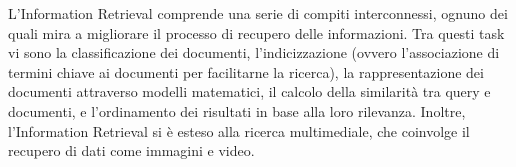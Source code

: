 L'Information Retrieval comprende una serie di compiti interconnessi, ognuno dei quali mira a migliorare il processo di recupero delle informazioni. Tra questi task vi sono la classificazione dei documenti, l'indicizzazione (ovvero l'associazione di termini chiave ai documenti per facilitarne la ricerca), la rappresentazione dei documenti attraverso modelli matematici, il calcolo della similarità tra query e documenti, e l'ordinamento dei risultati in base alla loro rilevanza. Inoltre, l'Information Retrieval si è esteso alla ricerca multimediale, che coinvolge il recupero di dati come immagini e video.
